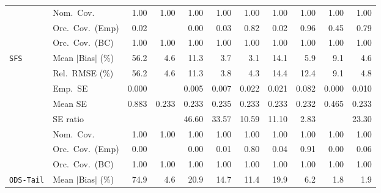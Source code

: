 \begin{landscape}
\begin{longtable}{llrrrrrrrrr}
 & Nom.\ Cov. & \cellcolor{rankone}1.00 & \cellcolor{rankone}1.00 & \cellcolor{rankone}1.00 & \cellcolor{rankone}1.00 & \cellcolor{rankone}1.00 & \cellcolor{rankone}1.00 & \cellcolor{rankone}1.00 & \cellcolor{rankone}1.00 & \cellcolor{rankone}1.00 \\
 & Orc.\ Cov.\ (Emp) & 0.02 &  & 0.00 & 0.03 & \cellcolor{ranktwo}0.82 & 0.02 & \cellcolor{rankone}0.96 & 0.45 & \cellcolor{rankthree}0.79 \\
 & Orc.\ Cov.\ (BC) & \cellcolor{rankone}1.00 & \cellcolor{rankone}1.00 & \cellcolor{rankone}1.00 & \cellcolor{rankone}1.00 & \cellcolor{rankone}1.00 & \cellcolor{rankone}1.00 & \cellcolor{rankone}1.00 & \cellcolor{rankone}1.00 & \cellcolor{rankone}1.00 \\
\addlinespace[2pt]
\quad \texttt{SFS} & Mean $|$Bias$|$ (\%) & 56.2 & \cellcolor{rankthree}4.6 & 11.3 & \cellcolor{ranktwo}3.7 & \cellcolor{rankone}3.1 & 14.1 & 5.9 & 9.1 & \cellcolor{rankthree}4.6 \\
 & Rel.\ RMSE (\%) & 56.2 & \cellcolor{rankthree}4.6 & 11.3 & \cellcolor{rankone}3.8 & \cellcolor{ranktwo}4.3 & 14.4 & 12.4 & 9.1 & 4.8 \\
 & Emp.\ SE & 0.000 &  & 0.005 & 0.007 & 0.022 & 0.021 & 0.082 & 0.000 & 0.010 \\
 & Mean SE & 0.883 & 0.233 & 0.233 & 0.235 & 0.233 & 0.233 & 0.232 & 0.465 & 0.233 \\
 & SE ratio &  &  & 46.60 & 33.57 & \cellcolor{ranktwo}10.59 & \cellcolor{rankthree}11.10 & \cellcolor{rankone}2.83 &  & 23.30 \\
 & Nom.\ Cov. & \cellcolor{rankone}1.00 & \cellcolor{rankone}1.00 & \cellcolor{rankone}1.00 & \cellcolor{rankone}1.00 & \cellcolor{rankone}1.00 & \cellcolor{rankone}1.00 & \cellcolor{rankone}1.00 & \cellcolor{rankone}1.00 & \cellcolor{rankone}1.00 \\
 & Orc.\ Cov.\ (Emp) & 0.00 &  & 0.00 & 0.01 & \cellcolor{ranktwo}0.80 & 0.04 & \cellcolor{rankone}0.91 & 0.00 & \cellcolor{rankthree}0.06 \\
 & Orc.\ Cov.\ (BC) & \cellcolor{rankone}1.00 & \cellcolor{rankone}1.00 & \cellcolor{rankone}1.00 & \cellcolor{rankone}1.00 & \cellcolor{rankone}1.00 & \cellcolor{rankone}1.00 & \cellcolor{rankone}1.00 & \cellcolor{rankone}1.00 & \cellcolor{rankone}1.00 \\
\addlinespace[2pt]
\quad \texttt{ODS-Tail} & Mean $|$Bias$|$ (\%) & 74.9 & \cellcolor{rankthree}4.6 & 20.9 & 14.7 & 11.4 & 19.9 & 6.2 & \cellcolor{rankone}1.8 & \cellcolor{ranktwo}1.9 \\

\end{longtable}
\end{landscape}
